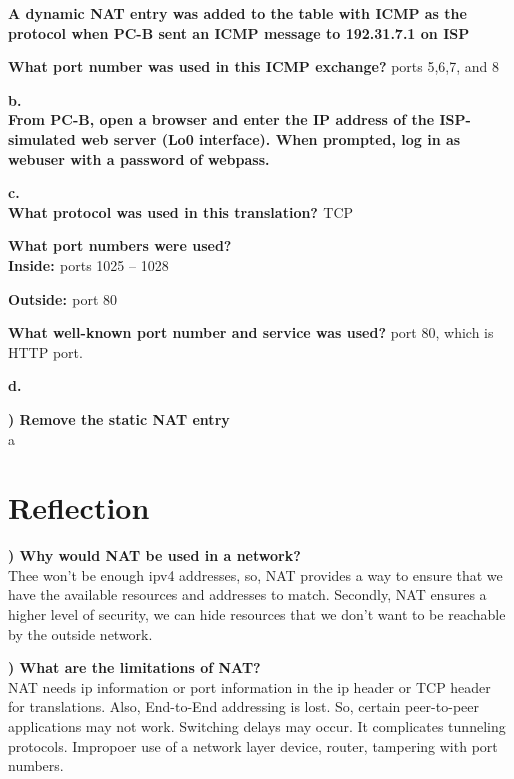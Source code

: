 \documentclass{report}
\newcommand{\mysection}[1]{\section*{#1}}
\newcommand{\mysubsection}[2]{\textbf{\romannumeral #1) #2}}
\begin{document}
{\bf{A dynamic NAT entry was added to the table with ICMP as the protocol when PC-B sent an ICMP
message to 192.31.7.1 on ISP}}


{\bf{What port number was used in this ICMP exchange?}} ports 5,6,7, and 8


{\bf{b.}}\\
{\bf{From PC-B, open a browser and enter the IP address of the ISP-simulated web server (Lo0 interface).
When prompted, log in as webuser with a password of webpass.}}



{\bf{c.}}\\
{\bf{What protocol was used in this translation? }} TCP


{\bf{What port numbers were used?}}\\
{\bf{Inside: }} ports 1025 -- 1028


{\bf{Outside: }} port 80


{\bf{What well-known port number and service was used?}} port 80, which is HTTP
port.


{\bf{d.}}

\noindent\mysubsection{7}{Remove the static NAT entry}\\
a


\mysection{\textbf{Reflection}}

\mysubsection{1}{Why would NAT be used in a network?}\\
Thee won't be enough ipv4 addresses, so, NAT provides a way to ensure that we
have the available resources and addresses to match. Secondly, NAT ensures a
higher level of security, we can hide resources that we don't want to be
reachable by the outside network.

\noindent\mysubsection{2}{What are the limitations of NAT?}\\
NAT needs ip information or port information in the ip header or TCP header for translations.
Also, End-to-End addressing is lost. So, certain peer-to-peer applications may
not work. Switching delays may occur. It complicates
tunneling protocols. Impropoer use of a network layer device, router, tampering
with port numbers.
  
\end{document}
